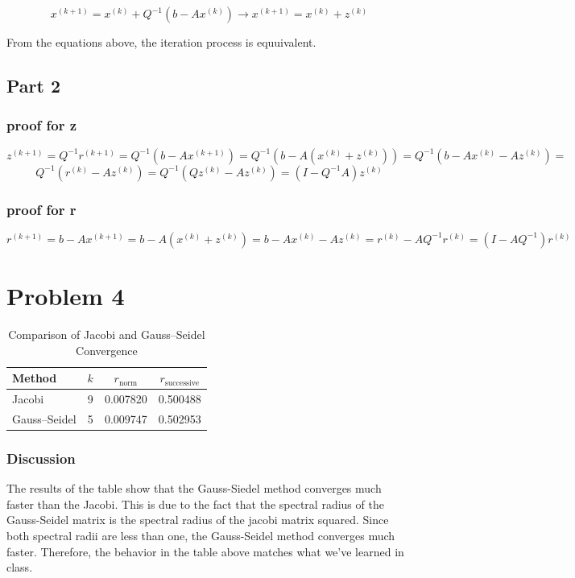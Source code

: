 \documentclass{article}
\begin{document}
$$x^{(k+1)}=x^{(k)} + Q^{-1}(b-Ax^{(k)}) \rightarrow x^{(k+1)} = x^{(k)} + z^{(k)}$$

\noindent From the equations above, the iteration process is equuivalent.

\subsection*{Part 2}

\subsubsection*{proof for z}

\[z^{(k+1)} = Q^{-1}r^{(k+1)} = Q^{-1}(b-Ax^{(k+1)}) = Q^{-1}(b-A(x^{(k)}+z^{(k)})) =Q^{-1}(b-Ax^{(k)} - Az^{(k)}) =\] 
\[Q^{-1}(r^{(k)}-Az^{(k)}) = Q^{-1}(Qz^{(k)}-Az^{(k)})=(I-Q^{-1}A)z^{(k)} \]

\subsubsection*{proof for r}
\[r^{(k+1)}=b-Ax^{(k+1)}=b-A(x^{(k)}+z^{(k)})=b-Ax^{(k)}-Az^{(k)}=r^{(k)}-AQ^{-1}r^{(k)}=(I-AQ^{-1})r^{(k)}\]

\section*{Problem 4}

\begin{table}[htbp]
\centering
\caption{Comparison of Jacobi and Gauss--Seidel Convergence}
\label{tab:comparison}
\begin{tabular}{|l c c c|}
\toprule
Method & $k$ & $r_{\text{norm}}$ & $r_{\text{successive}}$ \\
\midrule
Jacobi        & 9 & 0.007820 & 0.500488 \\
Gauss--Seidel & 5 & 0.009747 & 0.502953 \\
\bottomrule
\end{tabular}
\end{table}

\subsubsection*{Discussion}
The results of the table show that the Gauss-Siedel method converges much faster than the Jacobi. This is due to the fact that the 
spectral radius of the Gauss-Seidel matrix is the spectral radius of the jacobi matrix squared. Since both spectral radii are less than one,
the Gauss-Seidel method converges much faster. Therefore, the behavior in the table above matches what we've learned in class.
\end{document}
